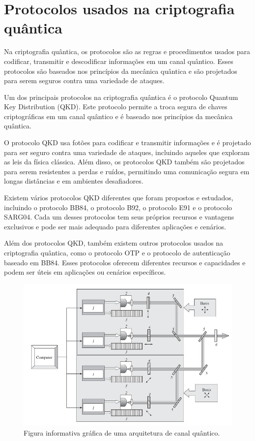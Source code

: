\chapter{Protocolos usados na criptografia quântica}

Na criptografia quântica, os protocolos são as regras e procedimentos usados para codificar, transmitir e descodificar informações em um canal quântico. Esses protocolos são baseados nos princípios da mecânica quântica e são projetados para serem seguros contra uma variedade de ataques.

Um dos principais protocolos na criptografia quântica é o protocolo Quantum Key Distribution (QKD). Este protocolo permite a troca segura de chaves criptográficas em um canal quântico e é baseado nos princípios da mecânica quântica.

O protocolo QKD usa fotões para codificar e transmitir informações e é projetado para ser seguro contra uma variedade de ataques, incluindo aqueles que exploram as leis da física clássica. Além disso, os protocolos QKD também são projetados para serem resistentes a perdas e ruídos, permitindo uma comunicação segura em longas distâncias e em ambientes desafiadores.

Existem vários protocolos QKD diferentes que foram propostos e estudados, incluindo o protocolo BB84, o protocolo B92, o protocolo E91 e o protocolo SARG04. Cada um desses protocolos tem seus próprios recursos e vantagens exclusivos e pode ser mais adequado para diferentes aplicações e cenários.

Além dos protocolos QKD, também existem outros protocolos usados na criptografia quântica, como o protocolo OTP e o protocolo de autenticação baseado em BB84. Esses protocolos oferecem diferentes recursos e capacidades e podem ser úteis em aplicações ou cenários específicos.

\begin{figure}[!hbt]
  \centering
  \includegraphics[width=\textwidth]{images/foton-pipeline.jpg}
  \caption{Figura informativa gráfica de uma arquitetura de canal quântico.}
  \label{fig:qkd-pipeline}
\end{figure}
\FloatBarrier


